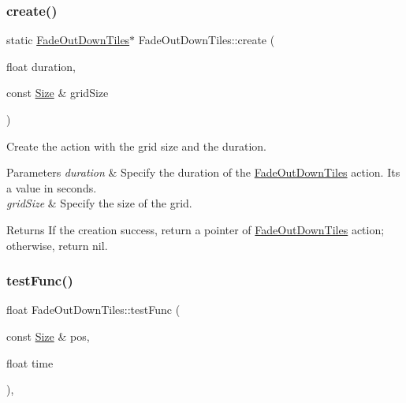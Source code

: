 \subsubsection{\texorpdfstring{create()}{create()}\hspace{0.1cm}{\footnotesize\ttfamily [2/2]}}
{\footnotesize\ttfamily static \hyperlink{classFadeOutDownTiles}{Fade\+Out\+Down\+Tiles}$\ast$ Fade\+Out\+Down\+Tiles\+::create (\begin{DoxyParamCaption}\item[{float}]{duration,  }\item[{const \hyperlink{classSize}{Size} \&}]{grid\+Size }\end{DoxyParamCaption})\hspace{0.3cm}{\ttfamily [static]}}



Create the action with the grid size and the duration. 


\begin{DoxyParams}{Parameters}
{\em duration} & Specify the duration of the \hyperlink{classFadeOutDownTiles}{Fade\+Out\+Down\+Tiles} action. It\textquotesingle{}s a value in seconds. \\
\hline
{\em grid\+Size} & Specify the size of the grid. \\
\hline
\end{DoxyParams}
\begin{DoxyReturn}{Returns}
If the creation success, return a pointer of \hyperlink{classFadeOutDownTiles}{Fade\+Out\+Down\+Tiles} action; otherwise, return nil. 
\end{DoxyReturn}
\mbox{\label{classFadeOutDownTiles_a6fa98b6fda5e72b41542f4209866c3f3}} 
\subsubsection{\texorpdfstring{test\+Func()}{testFunc()}\hspace{0.1cm}{\footnotesize\ttfamily [1/2]}}
{\footnotesize\ttfamily float Fade\+Out\+Down\+Tiles\+::test\+Func (\begin{DoxyParamCaption}\item[{const \hyperlink{classSize}{Size} \&}]{pos,  }\item[{float}]{time }\end{DoxyParamCaption})\hspace{0.3cm}{\ttfamily [override]}, {\ttfamily [virtual]}}



